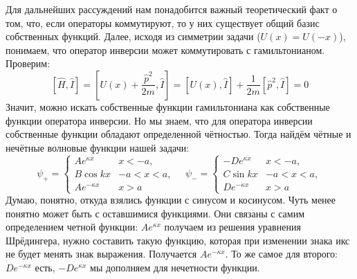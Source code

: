 Для дальнейших рассуждений нам понадобится важный теоретический факт о том, что, если операторы коммутируют, то у них существует общий базис собственных функций. Далее, исходя из симметрии задачи ($U(x) = U(-x)$), понимаем, что оператор инверсии может коммутировать с гамильтонианом. Проверим:
\[
[\hat{H}, \hat{I}] = [U(x) + \frac{\hat{p}^2}{2m}, \hat{I}] = [U(x), \hat{I}] + \frac{1}{2m} [\hat{p}^2, \hat{I}] = 0
\]
Значит, можно искать собственные функции гамильтониана как собственные функции оператора инверсии. Но мы знаем, что для оператора инверсии собственные функции обладают определенной чётностью. Тогда найдём чётные и нечётные волновые функции нашей задачи:
\[
\psi_+ =
\begin{cases}
    Ae^{\kappa x}& x < -a,\\
    B \cos kx & -a < x < a,\\
    Ae^{-\kappa x}& x > a
\end{cases}\quad
\psi_- =
\begin{cases}
    -De^{\kappa x}& x < -a,\\
    C \sin kx & -a < x < a,\\
    De^{-\kappa x}& x > a
\end{cases}
\]
Думаю, понятно, откуда взялись функции с синусом и косинусом. Чуть менее понятно может быть с оставшимися функциями. Они связаны с самим определением четной функции: $Ae^{\kappa x}$ получаем из решения уравнения Шрёдингера, нужно составить такую функцию, которая при изменении знака икс не будет менять знак выражения. Получается $Ae^{-\kappa x}$. То же самое для второго: $De^{-\kappa x}$ есть, $-De^{\kappa x}$ мы дополняем для нечетности функции.

